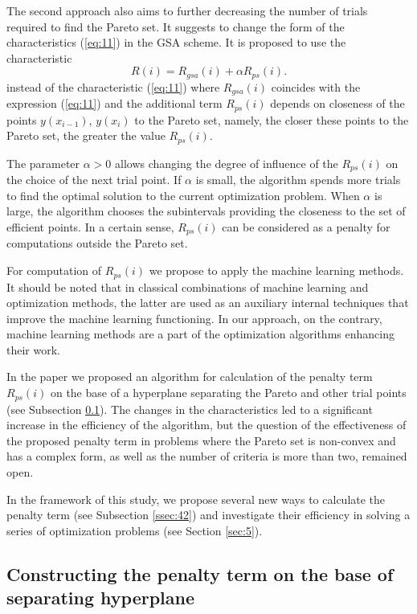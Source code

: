 \documentclass[runningheads]{llncs}
\begin{document}
The second approach also aims to further decreasing the number of trials required to find the Pareto set. It suggests to change the form of the characteristics (\ref{eq:11}) in the GSA scheme. It is proposed to use the characteristic 
\begin{equation}
    \label{eq:16}
    R(i) = R_{gsa} (i) +  \alpha R_{ps} (i).
\end{equation}
instead of the characteristic (\ref{eq:11}) where $R_{gsa}(i)$ coincides with the expression (\ref{eq:11}) and the additional term $R_{ps}(i)$ depends on closeness of the points $y(x_{i-1})$, $y(x_{i})$ to the Pareto set, namely, the closer these points to the Pareto set, the greater the value $R_{ps}(i)$.

The parameter $\alpha > 0$ allows changing the degree of influence of the $R_{ps}(i)$ on the choice of the next trial point. If $\alpha$ is small, the algorithm spends more trials to find the optimal solution to the current optimization problem. When $\alpha$ is large, the algorithm chooses the subintervals providing the closeness to the set of efficient points. In a certain sense, $R_{ps}(i)$ can be considered as a penalty for computations outside the Pareto set.

For computation of $R_{ps}(i)$ we propose to apply the machine learning methods. It should be noted that in classical combinations of machine learning and optimization methods, the latter are used as an auxiliary internal techniques that improve the machine learning functioning. In our approach, on the contrary, machine learning methods are a part of the optimization algorithms enhancing their work.

In the paper \cite{ML_MCO_2023} we proposed an algorithm for calculation of the penalty term $R_{ps}(i)$ on the base of a hyperplane separating the Pareto and other trial points (see Subsection \ref{ssec:41}). The changes in the characteristics led to a significant increase in the efficiency of the algorithm, but the question of the effectiveness of the proposed penalty term in problems where the Pareto set is non-convex and has a complex form, as well as the number of criteria is more than two, remained open.

In the framework of this study, we propose several new ways to calculate the penalty term (see Subsection \ref{ssec:42}) and investigate their efficiency in solving a series of optimization problems (see Section \ref{sec:5}).

\subsection{Constructing the penalty term on the base of separating hyperplane}
\label{ssec:41}
\end{document}
